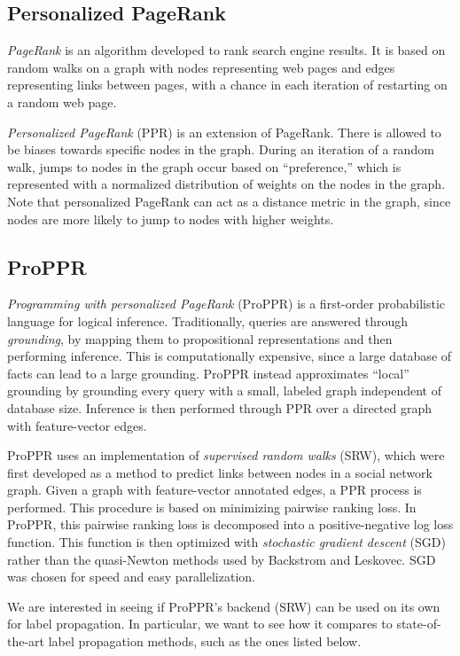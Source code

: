 \documentclass[12pt]{article}
\begin{document}
\subsection{Personalized PageRank}
\textit{PageRank} \cite{page1999pagerank} is an algorithm developed to rank search engine results.
It is based on random walks on a graph with nodes representing web pages and edges representing links between pages, with a chance in each iteration of restarting on a random web page.

\textit{Personalized PageRank} (PPR) \cite{haveliwala2003analytical} is an extension of PageRank.
There is allowed to be biases towards specific nodes in the graph.
During an iteration of a random walk, jumps to nodes in the graph occur based on ``preference,'' which is represented with a normalized distribution of weights on the nodes in the graph.
Note that personalized PageRank can act as a distance metric in the graph, since nodes are more likely to jump to nodes with higher weights.

\subsection{ProPPR}
\textit{Programming with personalized PageRank} (ProPPR) \cite{wang2013programming} is a first-order probabilistic language for logical inference.
Traditionally, queries are answered through \textit{grounding}, by mapping them to propositional representations and then performing inference.
This is computationally expensive, since a large database of facts can lead to a large grounding.
ProPPR instead approximates ``local'' grounding by grounding every query with a small, labeled graph independent of database size.
Inference is then performed through PPR over a directed graph with feature-vector edges.

ProPPR uses an implementation of \textit{supervised random walks} (SRW), \cite{backstrom2011supervised} which were first developed as a method to predict links between nodes in a social network graph.
Given a graph with feature-vector annotated edges, a PPR process is performed.
This procedure is based on minimizing pairwise ranking loss.
In ProPPR, this pairwise ranking loss is decomposed into a positive-negative log loss function.
This function is then optimized with \textit{stochastic gradient descent} (SGD) rather than the quasi-Newton methods used by Backstrom and Leskovec.
SGD was chosen for speed and easy parallelization.

We are interested in seeing if ProPPR's backend (SRW) can be used on its own for label propagation.
In particular, we want to see how it compares to state-of-the-art label propagation methods, such as the ones listed below.
\end{document}
